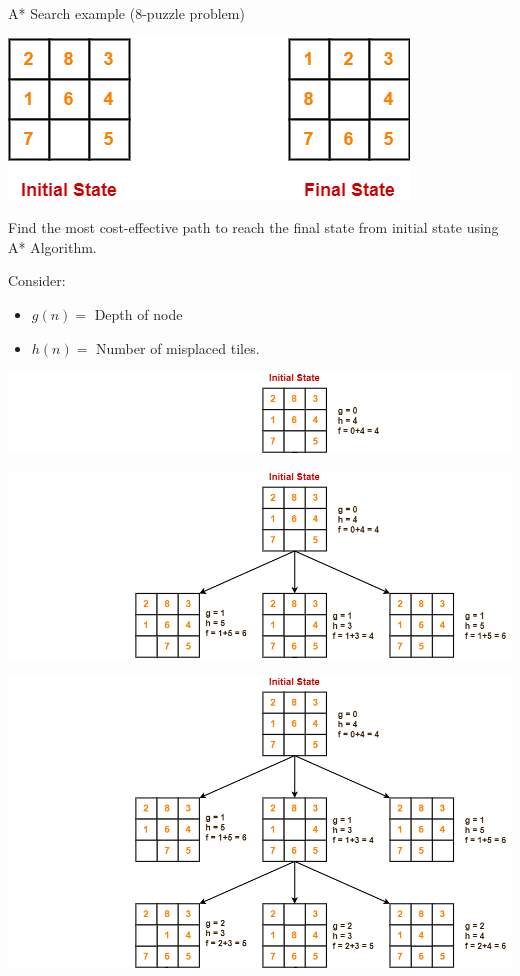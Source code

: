 \documentclass[9pt]{beamer}
\begin{document}
\begin{frame}{A* Search example (8-puzzle problem)}
\begin{small}

 {
\begin{center}
    \includegraphics[keepaspectratio, width=0.60\linewidth]{images/A-Algorithm-Problem-01.png}
\end{center}

Find the most cost-effective path to reach the final state from initial state using A* Algorithm.

Consider:
\begin{itemize}
    \item $g(n) =$ Depth of node
    \item $h(n) =$ Number of misplaced tiles.
\end{itemize}
}

 {
\begin{center}
    \includegraphics[keepaspectratio, width=0.75\linewidth]{images/Solve-Problem-01-01.png}
\end{center}
}

 {
\begin{center}
    \includegraphics[keepaspectratio, width=0.75\linewidth]{images/Solve-Problem-01-02.png}
\end{center}
}

 {
\begin{center}
    \includegraphics[keepaspectratio, width=0.75\linewidth]{images/Solve-Problem-01-03.png}
\end{center}
}


\end{small}
\end{frame}
\end{document}
